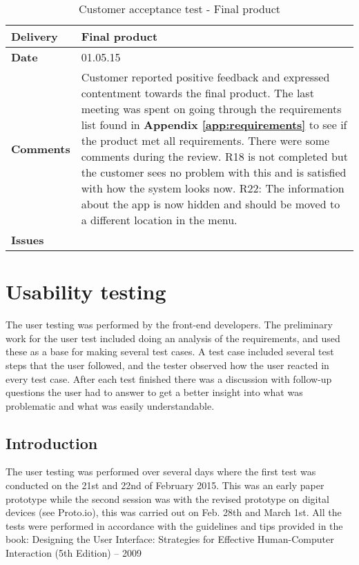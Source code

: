 \renewcommand{\arraystretch}{2}%
\begin{center}
	\begin{longtable}{ | p{4cm} | p{13cm} | }
		
		\caption[Customer acceptance test - Final product]{Customer acceptance test - Final product} \label{Tab:cattest5}\\
		\hline
		\textbf{Delivery} & Final product\\ \hline
		\textbf{Date} & 01.05.15 \\ \hline
		\textbf{Comments} & Customer reported positive feedback and expressed contentment towards the final product.  The last meeting was spent on going through the requirements list found in \textbf{Appendix \ref{app:requirements}} to see if the product met all requirements. There were some comments during the review. 
		R18 is not completed but the customer sees no problem with this and is satisfied with how the system looks now. 
		R22: The information about the app is now hidden and should be moved to a different location in the menu.   \\ \hline
		\textbf{Issues} \\ \hline
	\end{longtable}
\end{center}

\section{Usability testing}

The user testing was performed by the front-end developers. The preliminary work for the user test included doing an analysis of the requirements, and used these as a base for making several test cases. 
A test case included several test steps that the user followed, and the tester observed how the user reacted in every test case. After each test finished there was a discussion with follow-up questions the user had to answer to get a better insight into what was problematic and what was easily understandable.

\subsection{Introduction}
The user testing was performed over several days where the first test was conducted on the 21st and 22nd of February 2015. This was an early paper prototype while the second session was with the revised prototype on digital devices (see Proto.io), this was carried out on Feb. 28th and March 1st. All the tests were performed in accordance with the guidelines and tips provided in the book: Designing the User Interface: Strategies for Effective Human-Computer Interaction (5th Edition) – 2009 

